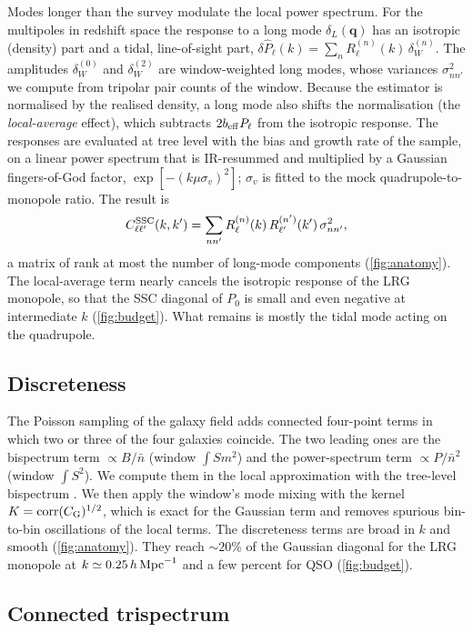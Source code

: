 Modes longer than the survey modulate the local power spectrum. For the multipoles in redshift space the response to a long mode $\delta_L(\boldsymbol q)$ has an isotropic (density) part and a tidal, line-of-sight part, $\delta\hat P_\ell(k) = \sum_n R^{(n)}_\ell(k)\,\delta^{(n)}_W$. The amplitudes $\delta^{(0)}_W$ and $\delta^{(2)}_W$ are window-weighted long modes, whose variances $\sigma^2_{nn'}$ we compute from tripolar pair counts of the window. Because the estimator is normalised by the realised density, a long mode also shifts the normalisation (the \emph{local-average} effect), which subtracts $2b_{\rm eff}P_\ell$ from the isotropic response. The responses are evaluated at tree level with the bias and growth rate of the sample, on a linear power spectrum that is IR-resummed and multiplied by a Gaussian fingers-of-God factor, $\exp[-(k\mu\sigma_v)^2]$; $\sigma_v$ is fitted to the mock quadrupole-to-monopole ratio. The result is
\begin{equation}
  C^{\rm SSC}_{\ell\ell'}(k,k') = \sum_{nn'} R^{(n)}_\ell(k)\,R^{(n')}_{\ell'}(k')\,\sigma^2_{nn'},
\end{equation}
a matrix of rank at most the number of long-mode components (\cref{fig:anatomy}). The local-average term nearly cancels the isotropic response of the LRG monopole, so that the SSC diagonal of $P_0$ is small and even negative at intermediate $k$ (\cref{fig:budget}). What remains is mostly the tidal mode acting on the quadrupole.

\subsection{Discreteness}

The Poisson sampling of the galaxy field adds connected four-point terms in which two or three of the four galaxies coincide. The two leading ones are the bispectrum term $\propto B/\bar n$ (window $\int S m^2$) and the power-spectrum term $\propto P/\bar n^2$ (window $\int S^2$). We compute them in the local approximation with the tree-level bispectrum \cite{SCF1999}. We then apply the window's mode mixing with the kernel $K=\mathrm{corr}(C_{\rm G})^{1/2}$, which is exact for the Gaussian term and removes spurious bin-to-bin oscillations of the local terms. The discreteness terms are broad in $k$ and smooth (\cref{fig:anatomy}). They reach $\sim20$\% of the Gaussian diagonal for the LRG monopole at $k\simeq0.25\,h\,\mathrm{Mpc}^{-1}$ and a few percent for QSO (\cref{fig:budget}).

\subsection{Connected trispectrum}

